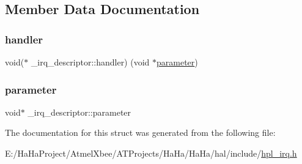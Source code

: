 \subsection{Member Data Documentation}
\mbox{\label{struct__irq__descriptor_a5c5645efb32460ff3105eff8e6206b91}} 
\subsubsection{\texorpdfstring{handler}{handler}}
{\footnotesize\ttfamily void($\ast$ \+\_\+irq\+\_\+descriptor\+::handler) (void $\ast$\hyperlink{struct__irq__descriptor_a9c58c3f373aebb6b725b9b47def981fd}{parameter})}

\mbox{\label{struct__irq__descriptor_a9c58c3f373aebb6b725b9b47def981fd}} 
\subsubsection{\texorpdfstring{parameter}{parameter}}
{\footnotesize\ttfamily void$\ast$ \+\_\+irq\+\_\+descriptor\+::parameter}



The documentation for this struct was generated from the following file\+:\begin{DoxyCompactItemize}
\item 
E\+:/\+Ha\+Ha\+Project/\+Atmel\+Xbee/\+A\+T\+Projects/\+Ha\+Ha/\+Ha\+Ha/hal/include/\hyperlink{hpl__irq_8h}{hpl\+\_\+irq.\+h}\end{DoxyCompactItemize}
